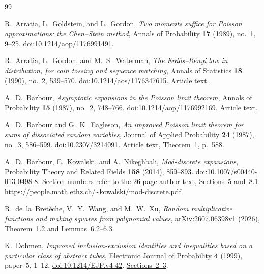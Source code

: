 \begin{thebibliography}{99}

R.~Arratia, L.~Goldstein, and L.~Gordon,
\emph{Two moments suffice for Poisson approximations:
the Chen--Stein method},
Annals of Probability \textbf{17} (1989), no.~1, 9--25.
\href{https://doi.org/10.1214/aop/1176991491}
{doi:10.1214/aop/1176991491}.

R.~Arratia, L.~Gordon, and M.~S.~Waterman,
\emph{The Erd\H{o}s--R\'enyi law in distribution, for coin tossing
and sequence matching},
Annals of Statistics \textbf{18} (1990), no.~2, 539--570.
\href{https://doi.org/10.1214/aos/1176347615}
{doi:10.1214/aos/1176347615}.
\href{https://dornsife.usc.edu/msw/wp-content/uploads/sites/236/2023/09/msw-093.pdf}
{Article text}.

A.~D.~Barbour,
\emph{Asymptotic expansions in the Poisson limit theorem},
Annals of Probability \textbf{15} (1987), no.~2, 748--766.
\href{https://doi.org/10.1214/aop/1176992169}
{doi:10.1214/aop/1176992169}.
\href{https://user.math.uzh.ch/barbour/pub/Barbour/AsympExpanPois.pdf}
{Article text}.

A.~D.~Barbour and G.~K.~Eagleson,
\emph{An improved Poisson limit theorem for sums of dissociated
random variables},
Journal of Applied Probability \textbf{24} (1987), no.~3, 586--599.
\href{https://doi.org/10.2307/3214091}
{doi:10.2307/3214091}.
\href{https://user.math.uzh.ch/barbour/pub/Barbour/BEagleson_ImprovedPoisson.pdf}
{Article text}, Theorem~1, p.~588.

A.~D.~Barbour, E.~Kowalski, and A.~Nikeghbali,
\emph{Mod-discrete expansions},
Probability Theory and Related Fields \textbf{158}
(2014), 859--893.
\href{https://doi.org/10.1007/s00440-013-0498-8}
{doi:10.1007/s00440-013-0498-8}.
Section numbers refer to the 26-page author text, Sections~5 and~8.1:
\url{https://people.math.ethz.ch/~kowalski/mod-discrete.pdf}.

R.~de~la~Bret\`eche, V.~Y.~Wang, and M.~W.~Xu,
\emph{Random multiplicative functions and making squares from
polynomial values},
\href{https://arxiv.org/abs/2607.06398v1}
{arXiv:2607.06398v1} (2026), Theorem~1.2 and
Lemmas~6.2--6.3.

K.~Dohmen,
\emph{Improved inclusion-exclusion identities and inequalities
based on a particular class of abstract tubes},
Electronic Journal of Probability \textbf{4} (1999), paper~5,
1--12.
\href{https://doi.org/10.1214/EJP.v4-42}
{doi:10.1214/EJP.v4-42}.
\href{https://www.maths.tcd.ie/EMIS/journals/EJP-ECP/article/download/42/42-83-1-PB.pdf}
{Sections~2--3}.


\end{thebibliography}
